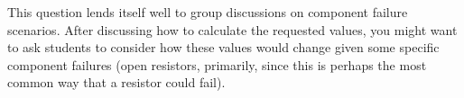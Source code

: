This question lends itself well to group discussions on component failure scenarios.  After discussing how to calculate the requested values, you might want to ask students to consider how these values would change given some specific component failures (open resistors, primarily, since this is perhaps the most common way that a resistor could fail).




